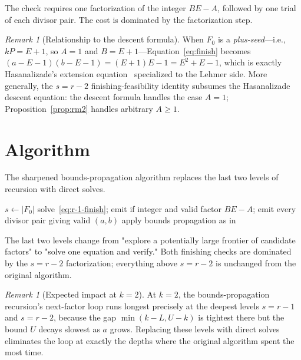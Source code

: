 \documentclass[11pt]{article}
\theoremstyle{definition}
\theoremstyle{remark}
\newtheorem{remark}[theorem]{Remark}
\begin{document}
The check requires one factorization of the integer $BE - A$, followed
by one trial of each divisor pair.  The cost is dominated by the
factorization step.

\begin{remark}[Relationship to the descent formula]
When $F_0$ is a \emph{plus-seed}---i.e., $k P = E + 1$, so $A = 1$ and
$B = E + 1$---Equation~\eqref{eq:finish} becomes
$(a - E - 1)(b - E - 1) = (E + 1) E - 1 = E^2 + E - 1$, which is exactly
Hasanalizade's extension equation~\cite{H26} specialized to the Lehmer
side.  More generally, the $s = r - 2$ finishing-feasibility identity
subsumes the Hasanalizade descent equation: the descent formula handles
the case $A = 1$; Proposition~\ref{prop:rm2} handles arbitrary $A \ge 1$.
\end{remark}

\section{Algorithm}

The sharpened bounds-propagation algorithm replaces the last two levels
of recursion with direct solves.

\begin{algorithm}[H]
\caption{Sharpened bounds propagation for $k$-Lehmer enumeration}
\label{alg:sharp}
\begin{algorithmic}[1]
\State $s \gets |F_0|$
    \State solve~\eqref{eq:r-1-finish}; emit if integer and valid
    \State factor $BE - A$; emit every divisor pair giving valid $(a, b)$
\Else
    \State apply bounds propagation as in~\cite{MS26}
        \State {}
    \EndFor
\EndIf
\EndProcedure
\end{algorithmic}
\end{algorithm}

The last two levels change from "explore a potentially large frontier of
candidate factors" to "solve one equation and verify."  Both finishing
checks are dominated by the $s = r - 2$ factorization; everything above
$s = r - 2$ is unchanged from the original algorithm.

\begin{remark}[Expected impact at $k = 2$]
At $k = 2$, the bounds-propagation recursion's next-factor loop runs
longest precisely at the deepest levels $s = r - 1$ and $s = r - 2$,
because the gap $\min(k - L, U - k)$ is tightest there but the bound
$U$ decays slowest as $a$ grows.  Replacing these levels with direct
solves eliminates the loop at exactly the depths where the original
algorithm spent the most time.
\end{remark}
\end{document}
